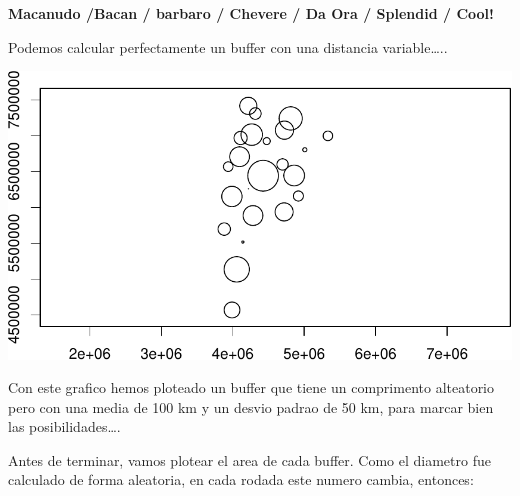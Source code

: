 \documentclass[]{book}
\newenvironment{Shaded}{\begin{snugshade}}{\end{snugshade}}
\newcommand{\CommentTok}[1]{\textcolor[rgb]{0.56,0.35,0.01}{\textit{#1}}}
\newcommand{\DataTypeTok}[1]{\textcolor[rgb]{0.13,0.29,0.53}{#1}}
\newcommand{\DecValTok}[1]{\textcolor[rgb]{0.00,0.00,0.81}{#1}}
\newcommand{\KeywordTok}[1]{\textcolor[rgb]{0.13,0.29,0.53}{\textbf{#1}}}
\newcommand{\NormalTok}[1]{#1}
\newcommand{\OperatorTok}[1]{\textcolor[rgb]{0.81,0.36,0.00}{\textbf{#1}}}
\newcommand{\StringTok}[1]{\textcolor[rgb]{0.31,0.60,0.02}{#1}}
\begin{document}
\textbf{Macanudo /Bacan / barbaro / Chevere / Da Ora / Splendid / Cool!}

Podemos calcular perfectamente un buffer con una distancia variable\ldots{}..

\begin{Shaded}
\end{Shaded}

\includegraphics{bookdown-demo_files/figure-latex/unnamed-chunk-54-1.pdf}

Con este grafico hemos ploteado un buffer que tiene un comprimento alteatorio pero con una media de 100 km y un desvio padrao de 50 km, para marcar bien las posibilidades\ldots{}.

Antes de terminar, vamos plotear el area de cada buffer. Como el diametro fue calculado de forma aleatoria, en cada rodada este numero cambia, entonces:

\begin{Shaded}
\end{Shaded}
\end{document}
